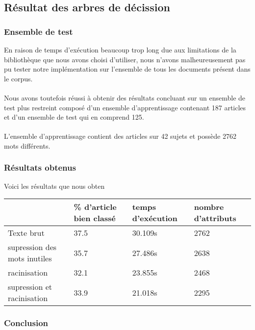 \subsection{Résultat des arbres de décission}

\subsubsection{Ensemble de test}

En raison de temps d’exécution beaucoup trop long due aux limitations de la bibliothèque que nous avons choisi d’utiliser, nous n’avons malheureusement pas pu tester notre implémentation sur l’ensemble de tous les documents présent dans le corpus.
\paragraph{}
Nous avons toutefois réussi à obtenir des résultats concluant sur un ensemble de test plus restreint composé d’un ensemble d’apprentissage contenant 187 articles et d’un ensemble de test qui en comprend 125.
\paragraph{}
L’ensemble d’apprentissage contient des articles sur 42 sujets et possède 2762 mots différents.

\subsubsection{Résultats obtenus}

Voici les résultats que nous obten

\begin{center}
    \begin{tabular}{| l | p{2cm} | p{2cm} | p{2cm} |}
    \hline
    & \% d'article bien classé & temps d'exécution & nombre d'attributs \\ \hline
    Texte brut & 37.5 & 30.109s & 2762 \\ \hline
    supression des mots inutiles & 35.7 & 27.486s & 2638 \\ \hline
	racinisation & 32.1 & 23.855s & 2468 \\ \hline
    supression et racinisation & 33.9 & 21.018s & 2295 \\
    \hline
    \end{tabular}
\end{center}

\subsubsection{Conclusion}

